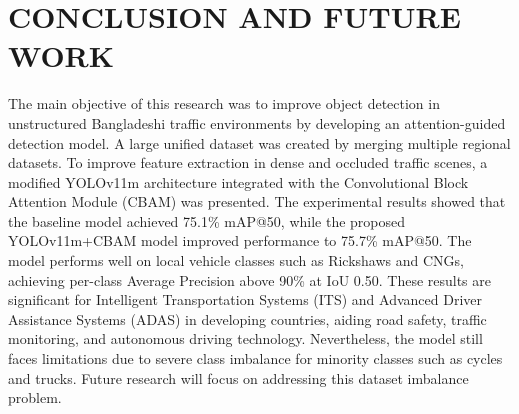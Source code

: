 \documentclass[conference]{IEEEtran}
\begin{document}
\section{CONCLUSION AND FUTURE WORK}
The main objective of this research was to improve object detection in unstructured Bangladeshi traffic environments by developing an attention-guided detection model. A large unified dataset was created by merging multiple regional datasets. To improve feature extraction in dense and occluded traffic scenes, a modified YOLOv11m architecture integrated with the Convolutional Block Attention Module (CBAM) was presented. The experimental results showed that the baseline model achieved 75.1\% mAP@50, while the proposed YOLOv11m+CBAM model improved performance to 75.7\% mAP@50. The model performs well on local vehicle classes such as Rickshaws and CNGs, achieving per-class Average Precision above 90\% at IoU 0.50. These results are significant for Intelligent Transportation Systems (ITS) and Advanced Driver Assistance Systems (ADAS) in developing countries, aiding road safety, traffic monitoring, and autonomous driving technology. Nevertheless, the model still faces limitations due to severe class imbalance for minority classes such as cycles and trucks. Future research will focus on addressing this dataset imbalance problem. 










\end{document}
